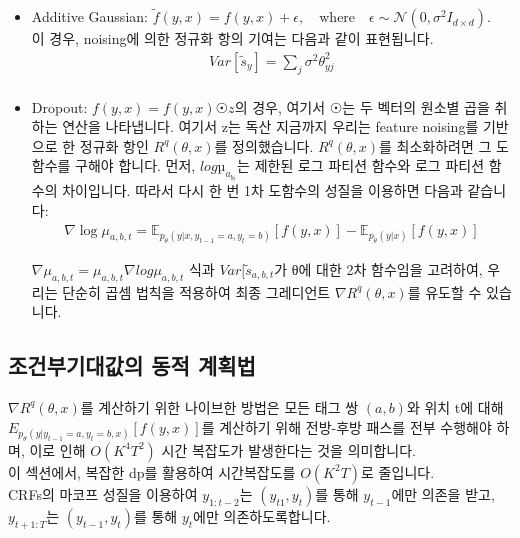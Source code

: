 \documentclass{article}
\begin{document}
\begin{itemize}
    \item Additive Gaussian:
    $\tilde{f}(y, x) = f(y, x) + \epsilon, \quad \text{where} \quad \epsilon \sim \mathcal{N}(0, \sigma^2 I_{d \times d}).$\\
    이 경우, noising에 의한 정규화 항의 기여는 다음과 같이 표현됩니다.\\
    \begin{align*}
        Var[\tilde{s}_y] = \sum_j \sigma^2 \theta^2_{yj}\\
    \end{align*}
    
    \item Dropout:
    $f(y, x) = f(y, x) ☉ z$의 경우, 여기서 $☉$는 두 벡터의 원소별 곱을 취하는 연산을 나타냅니다. 여기서 z는 독산
지금까지 우리는 feature noising를 기반으로 한 정규화 항인 $R^q(\theta, x)$를 정의했습니다. $R^q(\theta, x)$를 최소화하려면 그 도함수를 구해야 합니다. 먼저, $log µ_a_b_t$는 제한된 로그 파티션 함수와 로그 파티션 함수의 차이입니다. 따라서 다시 한 번 1차 도함수의 성질을 이용하면 다음과 같습니다:
\begin{align}
    \nabla \log \mu_{a,b,t} = \mathbb{E}_{p_\theta(y|x,y_{t-1}=a,y_t=b)}[f(y, x)] - \mathbb{E}_{p_\theta(y|x)}[f(y, x)]
\end{align}

$\nabla \mu_{a,b,t} = \mu_{a,b,t} \nabla log \mu_{a,b,t}$ 식과 $Var[\tilde{s}_{a,b,t}$가 θ에 대한 2차 함수임을 고려하여, 우리는 단순히 곱셈 법칙을 적용하여 최종 그레디언트 $\nabla R^q(\theta, x)$를 유도할 수 있습니다.

\end{itemize}

\subsection{조건부기대값의 동적 계획법}
$\nabla R^q(\theta, x)$를 계산하기 위한 나이브한 방법은 모든 태그 쌍 $(a, b)$와 위치 t에 대해 $E_{p_{\theta}(y|y_{t-1}=a, y_t=b, x)}[f(y, x)]$를 계산하기 위해 전방-후방 패스를 전부 수행해야 하며, 이로 인해 $O(K^4T^2)$ 시간 복잡도가 발생한다는 것을 의미합니다.\\

이 섹션에서, 복잡한 dp를 활용하여 시간복잡도를 $O(K^2T)$로 줄입니다.\\

CRFs의 마코프 성질을 이용하여 $y_{1:t−2}$는 $(y_{t1}, y_t)$를 통해 $y_{t−1}$에만 의존을 받고, $y_{t+1:T}$는 $(y_{t−1}, y_t)$를 통해 $y_t$에만 의존하도록합니다.\\
\end{document}
